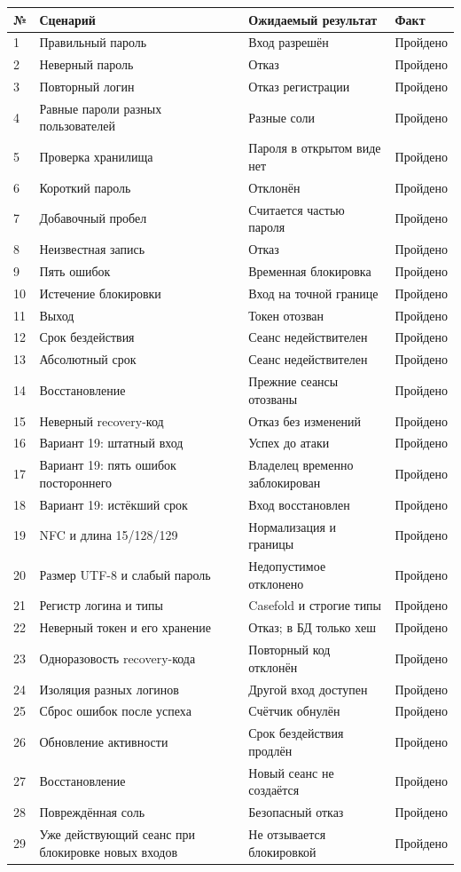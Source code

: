 \documentclass[12pt,a4paper]{article}
\begin{document}
\begin{longtable}{p{0.65cm}p{6.7cm}p{4cm}p{2.2cm}}
\toprule № & Сценарий & Ожидаемый результат & Факт \\
\midrule\endhead
1 & Правильный пароль & Вход разрешён & Пройдено \\
2 & Неверный пароль & Отказ & Пройдено \\
3 & Повторный логин & Отказ регистрации & Пройдено \\
4 & Равные пароли разных пользователей & Разные соли & Пройдено \\
5 & Проверка хранилища & Пароля в открытом виде нет & Пройдено \\
6 & Короткий пароль & Отклонён & Пройдено \\
7 & Добавочный пробел & Считается частью пароля & Пройдено \\
8 & Неизвестная запись & Отказ & Пройдено \\
9 & Пять ошибок & Временная блокировка & Пройдено \\
10 & Истечение блокировки & Вход на точной границе & Пройдено \\
11 & Выход & Токен отозван & Пройдено \\
12 & Срок бездействия & Сеанс недействителен & Пройдено \\
13 & Абсолютный срок & Сеанс недействителен & Пройдено \\
14 & Восстановление & Прежние сеансы отозваны & Пройдено \\
15 & Неверный recovery-код & Отказ без изменений & Пройдено \\
16 & Вариант 19: штатный вход & Успех до атаки & Пройдено \\
17 & Вариант 19: пять ошибок постороннего & Владелец временно заблокирован & Пройдено \\
18 & Вариант 19: истёкший срок & Вход восстановлен & Пройдено \\
19 & NFC и длина 15/128/129 & Нормализация и границы & Пройдено \\
20 & Размер UTF-8 и слабый пароль & Недопустимое отклонено & Пройдено \\
21 & Регистр логина и типы & Casefold и строгие типы & Пройдено \\
22 & Неверный токен и его хранение & Отказ; в БД только хеш & Пройдено \\
23 & Одноразовость recovery-кода & Повторный код отклонён & Пройдено \\
24 & Изоляция разных логинов & Другой вход доступен & Пройдено \\
25 & Сброс ошибок после успеха & Счётчик обнулён & Пройдено \\
26 & Обновление активности & Срок бездействия продлён & Пройдено \\
27 & Восстановление & Новый сеанс не создаётся & Пройдено \\
28 & Повреждённая соль & Безопасный отказ & Пройдено \\
29 & Уже действующий сеанс при блокировке новых входов & Не отзывается блокировкой & Пройдено \\
\bottomrule
\end{longtable}
\end{document}
